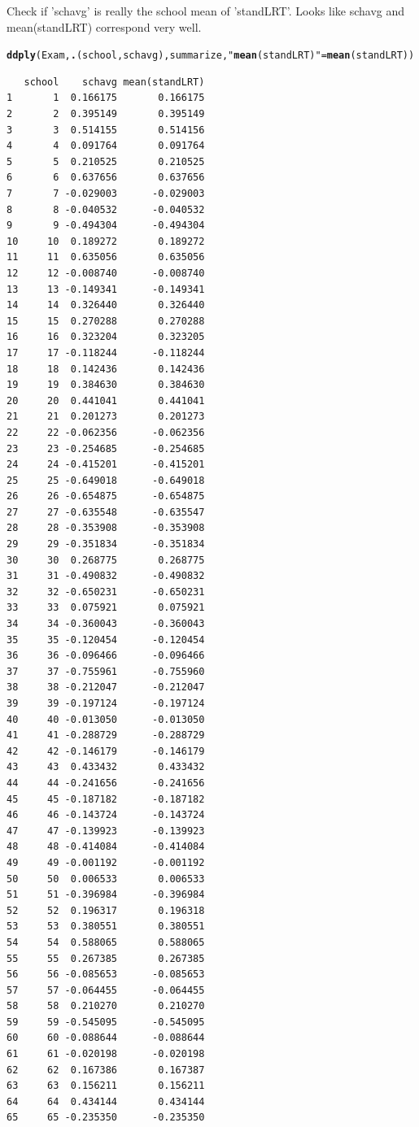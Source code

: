 \documentclass{article}\usepackage{graphicx, color}
\makeatletter
\newcommand{\hlfunctioncall}[1]{\textcolor[rgb]{0.501960784313725,0,0.329411764705882}{\textbf{#1}}}%
\newcommand{\hlstring}[1]{\textcolor[rgb]{0.6,0.6,1}{#1}}%
\newenvironment{kframe}{%
 \def\at@end@of@kframe{}%
 \ifinner\ifhmode%
  \def\at@end@of@kframe{\end{minipage}}%
  \begin{minipage}{\columnwidth}%
 \fi\fi%
 \def\FrameCommand##1{\hskip\@totalleftmargin \hskip-\fboxsep
 \colorbox{shadecolor}{##1}\hskip-\fboxsep
     \hskip-\linewidth \hskip-\@totalleftmargin \hskip\columnwidth}%
 \MakeFramed {\advance\hsize-\width
   \@totalleftmargin\z@ \linewidth\hsize
   \@setminipage}}%
 {\par\unskip\endMakeFramed%
 \at@end@of@kframe}
\newenvironment{knitrout}{}{} %
\makeatother
\begin{document}
Check if 'schavg' is really the school mean of 'standLRT'. Looks like schavg and mean(standLRT) correspond very well.
\begin{knitrout}
\color{fgcolor}\begin{kframe}
\begin{alltt}
\hlfunctioncall{ddply}(Exam, \hlfunctioncall{.}(school,schavg), summarize, \hlstring{"\hlfunctioncall{mean}(standLRT)"}=\hlfunctioncall{mean}(standLRT))
\end{alltt}
\begin{verbatim}
   school    schavg mean(standLRT)
1       1  0.166175       0.166175
2       2  0.395149       0.395149
3       3  0.514155       0.514156
4       4  0.091764       0.091764
5       5  0.210525       0.210525
6       6  0.637656       0.637656
7       7 -0.029003      -0.029003
8       8 -0.040532      -0.040532
9       9 -0.494304      -0.494304
10     10  0.189272       0.189272
11     11  0.635056       0.635056
12     12 -0.008740      -0.008740
13     13 -0.149341      -0.149341
14     14  0.326440       0.326440
15     15  0.270288       0.270288
16     16  0.323204       0.323205
17     17 -0.118244      -0.118244
18     18  0.142436       0.142436
19     19  0.384630       0.384630
20     20  0.441041       0.441041
21     21  0.201273       0.201273
22     22 -0.062356      -0.062356
23     23 -0.254685      -0.254685
24     24 -0.415201      -0.415201
25     25 -0.649018      -0.649018
26     26 -0.654875      -0.654875
27     27 -0.635548      -0.635547
28     28 -0.353908      -0.353908
29     29 -0.351834      -0.351834
30     30  0.268775       0.268775
31     31 -0.490832      -0.490832
32     32 -0.650231      -0.650231
33     33  0.075921       0.075921
34     34 -0.360043      -0.360043
35     35 -0.120454      -0.120454
36     36 -0.096466      -0.096466
37     37 -0.755961      -0.755960
38     38 -0.212047      -0.212047
39     39 -0.197124      -0.197124
40     40 -0.013050      -0.013050
41     41 -0.288729      -0.288729
42     42 -0.146179      -0.146179
43     43  0.433432       0.433432
44     44 -0.241656      -0.241656
45     45 -0.187182      -0.187182
46     46 -0.143724      -0.143724
47     47 -0.139923      -0.139923
48     48 -0.414084      -0.414084
49     49 -0.001192      -0.001192
50     50  0.006533       0.006533
51     51 -0.396984      -0.396984
52     52  0.196317       0.196318
53     53  0.380551       0.380551
54     54  0.588065       0.588065
55     55  0.267385       0.267385
56     56 -0.085653      -0.085653
57     57 -0.064455      -0.064455
58     58  0.210270       0.210270
59     59 -0.545095      -0.545095
60     60 -0.088644      -0.088644
61     61 -0.020198      -0.020198
62     62  0.167386       0.167387
63     63  0.156211       0.156211
64     64  0.434144       0.434144
65     65 -0.235350      -0.235350
\end{verbatim}
\end{kframe}
\end{knitrout}
\end{document}
